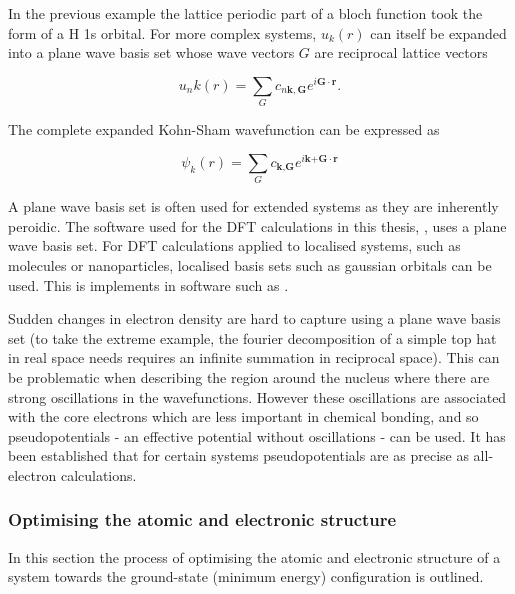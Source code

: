 In the previous example the lattice periodic part of a bloch function took the form of a H 1s orbital. For more complex systems, $u_k(r)$ can itself be expanded into a plane wave basis set whose wave vectors $G$ are reciprocal lattice vectors

\begin{equation}
u_nk(r) = \sum_Gc_{n\textbf{k},\textbf{G}}e^{i\textbf{G}\cdot\textbf{r}}.
\end{equation}

The complete expanded Kohn-Sham wavefunction can be expressed as

\begin{equation} \label{KSeigenstates}
\psi_k(r) = \sum_Gc_{\textbf{k},\textbf{G}}e^{i\textbf{k+G}\cdot\textbf{r}}
\end{equation}

A plane wave basis set is often used for extended systems as they are inherently peroidic. The software used for the DFT calculations in this thesis, \autocite{}, uses a plane wave basis set. For DFT calculations applied to localised systems, such as molecules or nanoparticles, localised basis sets such as gaussian orbitals can be used. This is implements in software such as \autcite{}.

Sudden changes in electron density are hard to capture using a plane wave basis set (to take the extreme example, the fourier decomposition of a simple top hat in real space needs requires an infinite summation in reciprocal space). This can be problematic when describing the region around the nucleus where there are strong oscillations in the wavefunctions. However these oscillations are associated with the core electrons which are less important in chemical bonding, and so pseudopotentials - an effective potential without oscillations - can be used. It has been established that for certain systems pseudopotentials are as precise as all-electron calculations.\autocite{Lejaeghere2016a}

\subsubsection{Optimising the atomic and electronic structure}

In this section the process of optimising the atomic and electronic structure of a system towards the ground-state (minimum energy) configuration is outlined. 

